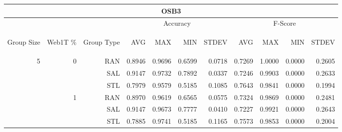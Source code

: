 \begin{center}
\begin{table}[htbp]
\begin{tabular}{ | r | r | r | r | r | r | r | r | r | r | r |}
\hline
\multicolumn{11}{|c|}{OSB3}\\
\hline
 & & & \multicolumn{4}{|c|}{Accuracy} & \multicolumn{4}{|c|}{F-Score}\\ \cline{4-11}
\begin{sideways}Group Size\end{sideways} & \begin{sideways}Web1T \%\end{sideways} & \begin{sideways}Group Type\end{sideways} & \begin{sideways}AVG\end{sideways} & \begin{sideways}MAX\end{sideways} & \begin{sideways}MIN\end{sideways} & \begin{sideways}STDEV\end{sideways} & \begin{sideways}AVG\end{sideways} & \begin{sideways}MAX\end{sideways} & \begin{sideways}MIN\end{sideways} & \begin{sideways}STDEV\end{sideways}\\
\hline
\multirow{18}{*}{5}
 & \multirow{3}{*}{0} & RAN & 0.8946 & 0.9696 & 0.6599 & 0.0718 & 0.7269 & 1.0000 & 0.0000 & 0.2605\\ \cline{3-11}
 &   & SAL & 0.9147 & 0.9732 & 0.7892 & 0.0337 & 0.7246 & 0.9903 & 0.0000 & 0.2633\\ \cline{3-11}
 &   & STL & 0.7979 & 0.9579 & 0.5185 & 0.1085 & 0.7643 & 0.9841 & 0.0000 & 0.1994\\ \cline{2-11}
 & \multirow{3}{*}{1} & RAN & 0.8970 & 0.9619 & 0.6565 & 0.0575 & 0.7324 & 0.9869 & 0.0000 & 0.2481\\ \cline{3-11}
 &   & SAL & 0.9147 & 0.9673 & 0.7777 & 0.0410 & 0.7227 & 0.9921 & 0.0000 & 0.2643\\ \cline{3-11}
 &   & STL & 0.7885 & 0.9741 & 0.5185 & 0.1165 & 0.7573 & 0.9853 & 0.0000 & 0.2004\\ \cline{2-11}

\end{tabular}
\end{table}
\end{center}
